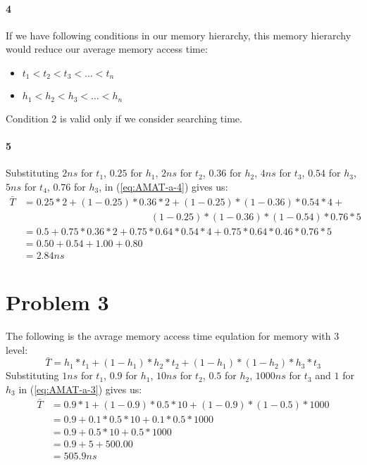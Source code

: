 \documentclass[11pt]{article}
\begin{document}
\paragraph{4}
If we have following conditions in our memory hierarchy, this memory hierarchy would reduce
our average memory access time:
\begin{itemize}
\item
	$t_1 < t_2 < t_3 < \ldots < t_n$
\item
	$h_1 < h_2 < h_3 < \ldots < h_n$
\end{itemize}
Condition 2 is valid only if we consider searching time.
\paragraph{5}
Substituting $2ns$ for $t_1$, $0.25$ for $h_1$, $2ns$ for $t_2$, $0.36$ for $h_2$, $4ns$ for $t_3$, $0.54$ for $h_3$,$5ns$ for $t_4$, $0.76$ for $h_3$,
in (\ref{eq:AMAT-a-4}) gives us:
\begin{align*}
	\bar{T} &= 0.25 * 2 + (1 - 0.25) * 0.36 * 2 + (1 - 0.25) * (1 - 0.36) * 0.54 * 4 + \\
	&\qquad \phantom{= 0.25 * 2 + (1 - 0.25)} (1 - 0.25) * (1 - 0.36) * (1 - 0.54) * 0.76 * 5 \\
	&= 0.5 + 0.75 * 0.36 * 2 + 0.75 * 0.64 * 0.54 * 4 + 0.75 * 0.64 * 0.46 * 0.76 * 5 \\
	&= 0.50 + 0.54 + 1.00 + 0.80 \\
	&= 2.84ns
\end{align*}
\section{Problem 3}
The following is the avrage memory access time equlation for
memory with 3 level:
\begin{equation}
	\label{eq:AMAT-a-3}
	\bar{T} = h_1 * t_1 + (1 - h_1) * h_2 * t_2 + (1 - h_1) * (1 - h_2) * h_3 * t_3
\end{equation}
Substituting $1ns$ for $t_1$, $0.9$ for $h_1$, $10ns$ for $t_2$, $0.5$ for $h_2$, $1000ns$ for $t_3$ and $1$ for $h_3$
in (\ref{eq:AMAT-a-3}) gives us:
\begin{align*}
	\bar{T} &= 0.9 * 1 + (1 - 0.9) * 0.5 * 10 + (1 - 0.9) * (1 - 0.5) * 1000\\
	&= 0.9 + 0.1 * 0.5 * 10 + 0.1 * 0.5 * 1000\\
	&= 0.9 + 0.5 * 10 + 0.5 * 1000\\
	&= 0.9 + 5 + 500.00\\
	&= 505.9ns
\end{align*}
\end{document}
